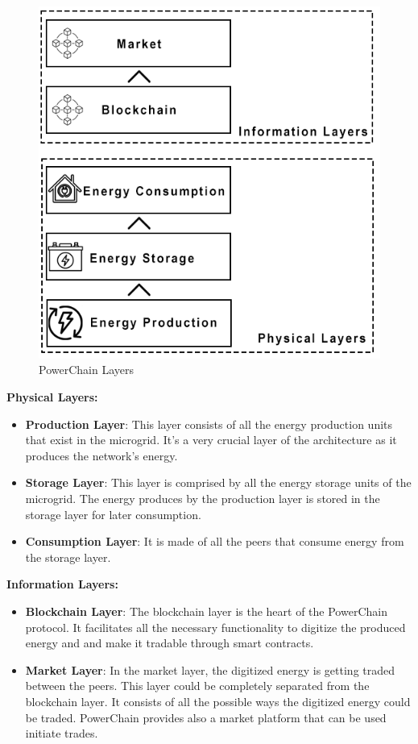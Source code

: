 \begin{figure}[h!]
    \centering
    \includegraphics[scale=0.6]{Figures/PowerChain_Layers.png}
    \caption{PowerChain Layers}
\end{figure}

\textbf{Physical Layers:}
\begin{itemize}
    \item \textbf{Production Layer}: This layer consists of all the energy production units that exist in the microgrid. It's a very crucial layer of the architecture as it
          produces the network's energy.
    \item \textbf{Storage Layer}: This layer is comprised by all the energy storage units of the microgrid. The energy produces by the production layer is stored in the storage
          layer for later consumption.
    \item \textbf{Consumption Layer}: It is made of all the peers that consume energy from the storage layer.
\end{itemize}

\textbf{Information Layers:}
\begin{itemize}
    \item \textbf{Blockchain Layer}: The blockchain layer is the heart of the PowerChain protocol. It facilitates all the necessary functionality to digitize the produced energy and
          and make it tradable through smart contracts.
    \item \textbf{Market Layer}: In the market layer, the digitized energy is getting traded between the peers. This layer could be completely separated from the blockchain layer. It consists
          of all the possible ways the digitized energy could be traded. PowerChain provides also a market platform that can be used initiate trades.
\end{itemize}

